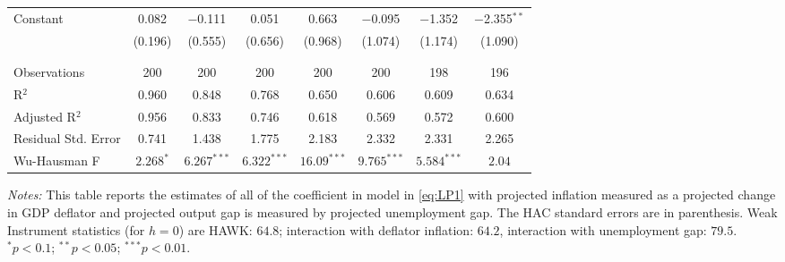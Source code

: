 \documentclass[11pt]{article}
\begin{document}
\begin{table}[!htbp]
\begin{threeparttable}
\begin{tabular}{@{\extracolsep{3pt}}lccccccc}
   Constant & 0.082 & $-$0.111 & 0.051 & 0.663 & $-$0.095 & $-$1.352 & $-$2.355$^{**}$ \\ 
   & (0.196) & (0.555) & (0.656) & (0.968) & (1.074) & (1.174) & (1.090) \\ 
   & & & & & & & \\ 
  \hline \\[-1.8ex] 
  Observations & 200 & 200 & 200 & 200 & 200 & 198 & 196 \\ 
  R$^{2}$ & 0.960 & 0.848 & 0.768 & 0.650 & 0.606 & 0.609 & 0.634 \\ 
  Adjusted R$^{2}$ & 0.956 & 0.833 & 0.746 & 0.618 & 0.569 & 0.572 & 0.600 \\ 
  Residual Std. Error & 0.741 & 1.438 & 1.775 & 2.183 & 2.332 & 2.331 & 2.265 \\ 
  Wu-Hausman F& $2.268^{*}$& $6.267^{***}$ & $6.322^{***}$ & $16.09^{***}$ & $9.765^{***}$ & $5.584^{***}$ & $2.04$\\
  \hline 
  \hline
  \end{tabular} 
  \begin{tablenotes}[flushleft]
    \item[] \textit{Notes:} This table reports the estimates of all of the coefficient in model in \vref{eq:LP1} with projected inflation measured as a projected change in GDP deflator and projected output gap is measured by projected unemployment gap. The \citet{Andrews1991} HAC standard errors are in parenthesis. Weak Instrument statistics (for $h=0$) are HAWK: $64.8$; interaction with deflator inflation: $64.2$, interaction with unemployment gap: $79.5$. $^{*}p<0.1$; $^{**}p<0.05$; $^{***}p<0.01$.
  \end{tablenotes}
\end{threeparttable}
    \end{table} 
\end{document}
